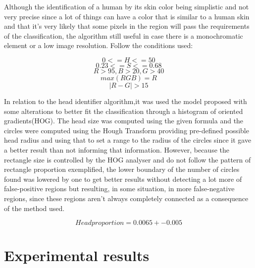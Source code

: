 \documentclass[conference]{IEEEtran}
\begin{document}
	Although the identification of a human by its skin color being simplistic and not very precise since a lot of things can have a color that is similar to a human skin and that it's very likely that some pixels in the region will pass the requirements of the classification, the algorithm still useful in case there is a monochromatic element or a low image resolution. Follow the conditions used:
	
\[ 0 <= H <= 50\]
\[ 0.23 <= S <= 0.68\]
\[ R > 95 , B > 20, G > 40\]
\[ max(RGB) = R\]
\[ |R - G| > 15\]
	
	In relation to the head identifier algorithm,it was used the model proposed with some alterations to better fit the classification through a histogram of oriented gradients(HOG). The head size was computed using the given formula and the circles were computed using the Hough Transform providing pre-defined possible head radius and using that to set a range to the radius of the circles since it gave a better result than not informing that information. However, because the rectangle size is controlled by the HOG analyser and do not follow the pattern of rectangle proportion exemplified, the lower boundary of the number of circles found was lowered by one to get better results without detecting a lot more of false-positive regions but resulting, in some situation, in more false-negative regions, since these regions aren't always completely connected as a consequence of the method used.
	
	\[Head proportion = 0.0065 +- 0.005\]

\section{Experimental results}
\end{document}
